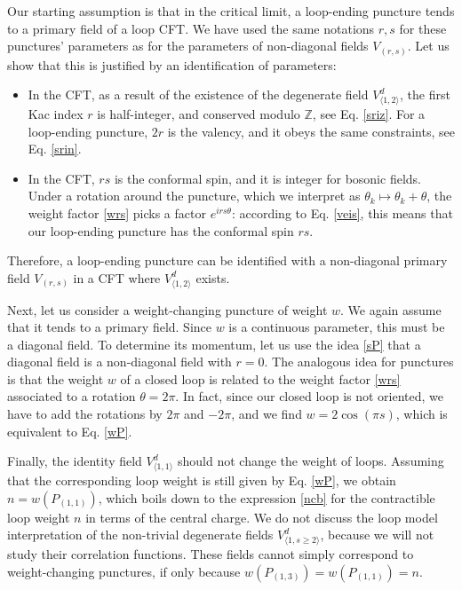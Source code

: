 \documentclass[12pt, a4paper]{article}
\theoremstyle{break}
\begin{document}
Our starting assumption is that in the critical limit, a loop-ending puncture tends to a primary field of a loop CFT. We have used the same notations $r,s$ for these punctures' parameters as for the parameters of non-diagonal fields $V_{(r,s)}$. Let us show that this is justified by an identification of parameters:
\begin{itemize}
 \item In the CFT, as a result of the existence of the degenerate field $V^d_{\langle 1,2\rangle}$, the first Kac index $r$ is half-integer, and conserved modulo $\mathbb{Z}$, see Eq. \eqref{sriz}. For a loop-ending puncture, $2r$ is the valency, and it obeys the same constraints, see Eq. \eqref{srin}.
 \item In the CFT, $rs$ is the conformal spin, and it is integer for bosonic fields. Under a rotation around the puncture, which we interpret as $\theta_k\mapsto \theta_k + \theta$, the weight factor \eqref{wrs} picks a factor $e^{irs\theta}$: according to Eq. \eqref{veis}, this means that our loop-ending puncture has the conformal spin $rs$. 
\end{itemize}
Therefore, a loop-ending puncture can be identified with a non-diagonal primary field $V_{(r,s)}$ in a CFT where $V^d_{\langle 1,2\rangle}$ exists. 

Next, let us consider a weight-changing puncture of weight $w$. We again assume that it tends to a primary field. Since $w$ is a continuous parameter, this must be a diagonal field. To determine its momentum, let us use the idea \eqref{sP} that a diagonal field is a non-diagonal field with $r=0$. The analogous idea for punctures is that the weight $w$ of a closed loop is related to the weight factor \eqref{wrs} associated to a rotation $\theta = 2\pi$. In fact, since our closed loop is not oriented, we have to add the rotations by $2\pi$ and $-2\pi$, and we find $w=2\cos(\pi s)$, which is equivalent to Eq. \eqref{wP}. 

Finally, the identity field $V^d_{\langle 1,1\rangle}$ should not change the weight of loops. Assuming that 
the corresponding loop weight is still given by Eq. \eqref{wP}, we obtain 
$n=w(P_{(1,1)})$, which boils down to the expression \eqref{ncb} for the contractible loop weight $n$ in terms of the central charge. We do not discuss the loop model interpretation of the non-trivial degenerate fields $V^d_{\langle 1,s\geq 2\rangle}$, because we will not study their correlation functions. These fields cannot simply correspond to weight-changing punctures, if only because $w(P_{(1,3)})=w(P_{(1,1)})=n$. 
\end{document}
